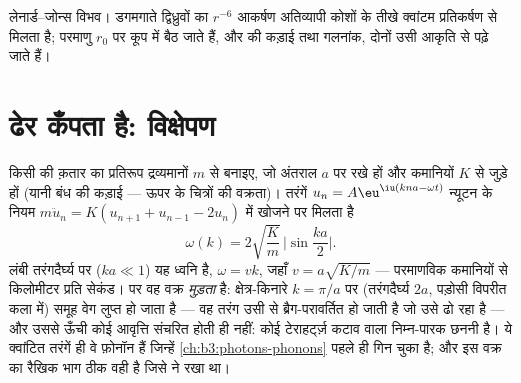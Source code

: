 \begin{omfigure}

{\small लेनार्ड--जोन्स विभव। डगमगाते द्विध्रुवों का $r^{-6}$
आकर्षण अतिव्यापी कोशों के तीखे क्वांटम प्रतिकर्षण से मिलता है;
परमाणु $r_0$ पर कूप में बैठ जाते हैं, और
 की कड़ाई तथा गलनांक, दोनों उसी आकृति से पढ़े जाते हैं।}
\end{omfigure}

\section{ढेर कँपता है: विक्षेपण}

\begin{theorem}[एकपरमाणुक शृंखला का विक्षेपण]\label{thm:b3:crystalline-solids:dispersion}
किसी  की क़तार का प्रतिरूप द्रव्यमानों $m$ से बनाइए, जो
अंतराल $a$ पर रखे हों और कमानियों $K$ से जुड़े हों (यानी बंध की कड़ाई
--- ऊपर के चित्रों की वक्रता)। तरंगें
$u_n = A\eu^{\iu(kna - \omega t)}$ न्यूटन के नियम
$m\ddot u_n = K(u_{n+1} + u_{n-1} - 2u_n)$ में खोजने पर मिलता है
\[
\omega(k) = 2\sqrt{\frac{K}{m}}\,\Big|\sin\frac{ka}{2}\Big| .
\]
लंबी तरंगदैर्घ्य पर ($ka \ll 1$) यह ध्वनि है, $\omega = vk$, जहाँ
$v = a\sqrt{K/m}$ --- परमाणविक कमानियों से किलोमीटर प्रति सेकंड।
पर वह वक्र \emph{मुड़ता} है: क्षेत्र-किनारे $k = \pi/a$ पर
(तरंगदैर्घ्य $2a$, पड़ोसी विपरीत कला में) समूह वेग
लुप्त हो जाता है --- वह तरंग उसी  से ब्रैग-परावर्तित हो जाती है
जो उसे ढो रहा है --- और उससे ऊँची कोई आवृत्ति संचरित होती ही नहीं:
कोई  टेराहर्ट्ज़ कटाव वाला निम्न-पारक छननी है। ये क्वांटित
तरंगें ही वे फ़ोनॉन हैं जिन्हें \cref{ch:b3:photons-phonons} पहले ही
गिन चुका है; और इस वक्र का रैखिक भाग ठीक वही है जिसे  ने रखा था।
\end{theorem}

